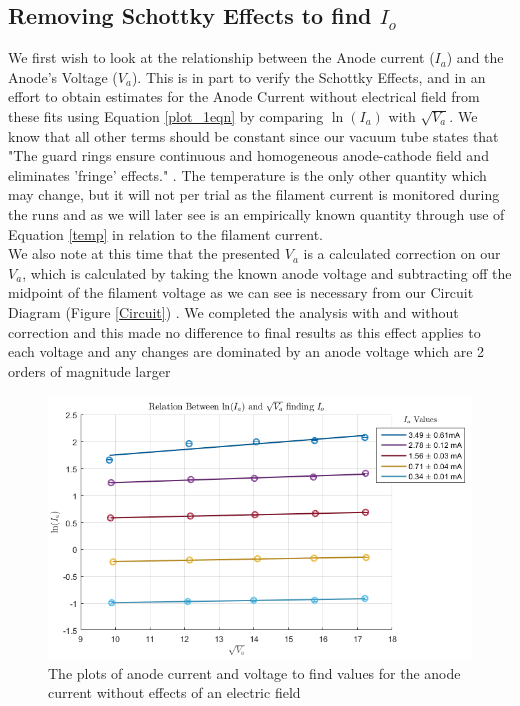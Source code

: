 \subsection{Removing Schottky Effects to find $I_o$}

We first wish to look at the relationship between the Anode current ($I_a$) and the Anode's Voltage ($V_a$). This is in part to verify the Schottky Effects, and in an effort to obtain estimates for the Anode Current without electrical field from these fits using Equation \ref{plot_1eqn} by comparing $\ln(I_a)$ with $\sqrt{V_a}$. We know that all other terms should be constant since our vacuum tube states that "The guard rings ensure continuous and homogeneous anode-cathode field and eliminates 'fringe' effects." \cite{GRD7}. The temperature is the only other quantity which may change, but it will not per trial as the filament current is monitored during the runs and as we will later see is an empirically known quantity through use of Equation \ref{temp} in relation to the filament current.\\

We also note at this time that the presented $V_a$ is a calculated correction on our $V_a$, which is calculated by taking the known anode voltage and subtracting off the midpoint of the filament voltage as we can see is necessary from our Circuit Diagram (Figure \ref{Circuit}) \cite{LabProcedure}. We completed the analysis with and without correction and this made no difference to final results as this effect applies to each voltage and any changes are dominated by an anode voltage which are 2 orders of magnitude larger

\begin{figure}[ht!]
\includegraphics[scale=.95]{figures/plot_1_Io.png}%
\caption{The plots of anode current and voltage to find values for the anode current without effects of an electric field }%
\label{fig:plot_1}
\end{figure}

